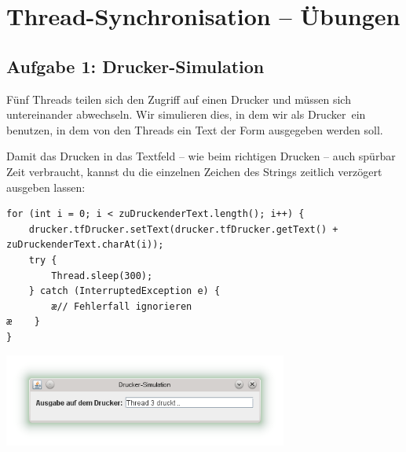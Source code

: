 \clearpage

\rehead[]{\textcolor{lightblue}{AvHG, Inf, My}}
\lohead[]{\textcolor{lightblue}{AvHG, Inf, My}}

\section{Thread-Synchronisation -- Übungen}

\subsection{Aufgabe 1: Drucker-Simulation}

Fünf Threads teilen sich den Zugriff auf einen Drucker und müssen sich
untereinander abwechseln. Wir simulieren dies, in dem wir als \glqq
Drucker\grqq\ ein  benutzen, in dem von den Threads
ein Text der Form  ausgegeben werden
soll.

Damit das Drucken in das Textfeld -- wie beim richtigen Drucken -- auch spürbar
Zeit verbraucht, kannst du die einzelnen Zeichen des Strings zeitlich verzögert
ausgeben lassen:

\begin{lstlisting}
for (int i = 0; i < zuDruckenderText.length(); i++) {
    drucker.tfDrucker.setText(drucker.tfDrucker.getText() + zuDruckenderText.charAt(i)); 
    try {
        Thread.sleep(300);
    } catch (InterruptedException e) {
        æ// Fehlerfall ignorieren
æ    }
}
\end{lstlisting}

\includegraphics[width=0.7\textwidth]{./inf/SEKII/26_Java_Threads/Drucker-Simulation_synchronisiert.png}

